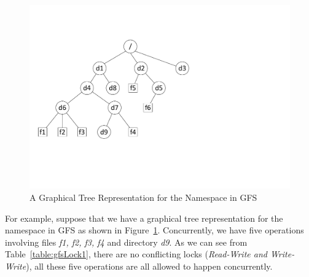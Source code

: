 \begin{figure}[ht]
	\centering
	\includegraphics[scale=0.7]{figs/gfstree.pdf}
	\caption{A Graphical Tree Representation for the Namespace in GFS}
	\label{fig:gfsTree}
\end{figure}

\noindent For example, suppose that we have a graphical tree representation for the namespace in GFS as shown in Figure~\ref{fig:gfsTree}. Concurrently, we have five operations involving files \textit{f1, f2, f3, f4} and directory \textit{d9}. As we can see from Table~\ref{table:gfsLock1}, there are no conflicting locks (\textit{Read-Write and Write-Write}), all these five operations are all allowed to happen concurrently.

